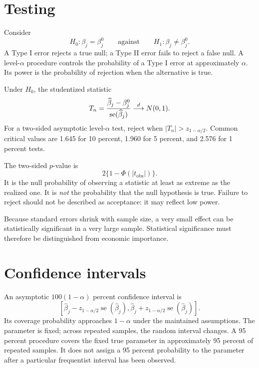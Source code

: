 \section{Testing}

Consider
\[
  H_0:\beta_j=\beta_j^0
  \qquad\text{against}\qquad
  H_1:\beta_j\neq\beta_j^0.
\]
A Type I error rejects a true null; a Type II error fails to reject a false
null.  A level-$\alpha$ procedure controls the probability of a Type I error
at approximately $\alpha$.  Its power is the probability of rejection when
the alternative is true.

Under $H_0$, the studentized statistic
\begin{equation}
\label{eq:t-stat}
  T_n=\frac{\widehat\beta_j-\beta_j^0}
  {\operatorname{se}(\widehat\beta_j)}
  \overset{d}{\longrightarrow} N(0,1).
\end{equation}
For a two-sided asymptotic level-$\alpha$ test, reject when
$|T_n|>z_{1-\alpha/2}$.  Common critical values are 1.645 for 10 percent,
1.960 for 5 percent, and 2.576 for 1 percent tests.

The two-sided $p$-value is
\[
  2\{1-\Phi(|t_{\mathrm{obs}}|)\}.
\]
It is the null probability of observing a statistic at least as extreme as
the realized one.  It is \emph{not} the probability that the null hypothesis
is true.  Failure to reject should not be described as acceptance: it may
reflect low power.

Because standard errors shrink with sample size, a very small effect can be
statistically significant in a very large sample.  Statistical significance
must therefore be distinguished from economic importance.

\section{Confidence intervals}

An asymptotic $100(1-\alpha)$ percent confidence interval is
\begin{equation}
\label{eq:ci}
  \left[
  \widehat\beta_j-z_{1-\alpha/2}\operatorname{se}(\widehat\beta_j),
  \widehat\beta_j+z_{1-\alpha/2}\operatorname{se}(\widehat\beta_j)
  \right].
\end{equation}
Its coverage probability approaches $1-\alpha$ under the maintained
assumptions.  The parameter is fixed; across repeated samples, the random
interval changes.  A 95 percent procedure covers the fixed true parameter in
approximately 95 percent of repeated samples.  It does not assign a 95
percent probability to the parameter after a particular frequentist interval
has been observed.

